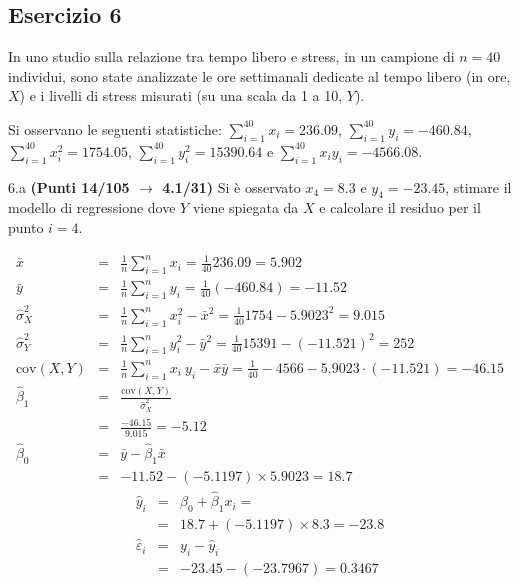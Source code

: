 \documentclass[
  11pt,
]{book}
\theoremstyle{mytheoremstyle}
\theoremstyle{mydefstyle}
\newenvironment{sol}
  {
  \begin{tcolorbox}[enhanced,breakable,arc=0.1mm,boxrule=1pt,colback=white,colframe=iblue,
  title=\bf \fontfamily{lmss}\selectfont \hspace{.5 cm} Soluzione,drop fuzzy shadow]

}{
\end{tcolorbox}
  }
\begin{document}
\subsection{Esercizio 6}\label{esercizio-6-34}

In uno studio sulla relazione tra tempo libero e stress, in un campione di \(n=40\) individui, sono state analizzate le ore settimanali dedicate al tempo libero (in ore, \(X\)) e i livelli di stress misurati (su una scala da 1 a 10, \(Y\)).

Si osservano le seguenti statistiche:
\(\sum_{i=1}^{40}x_i=236.09\), \(\sum_{i=1}^{40}y_i=-460.84\),
\(\sum_{i=1}^{40}x_i^2=1754.05\), \(\sum_{i=1}^{40}y_i^2=15390.64\) e \(\sum_{i=1}^{40}x_iy_i=-4566.08\).

6.a \textbf{(Punti 14/105 \(\rightarrow\) 4.1/31)} Si è osservato \(x_4=8.3\) e \(y_4=-23.45\), stimare il modello di regressione dove \(Y\) viene spiegata da \(X\) e calcolare il residuo per il punto \(i=4\).

\begin{sol}
\begin{eqnarray*}
           \bar x &=&\frac 1 n\sum_{i=1}^n x_i = \frac {1}{ 40 }  236.09 =  5.902 \\
           \bar y &=&\frac 1 n\sum_{i=1}^n y_i = \frac {1}{ 40 }  (-460.84) =  -11.52 \\
           \hat\sigma_X^2&=&\frac 1 n\sum_{i=1}^n x_i^2-\bar x^2=\frac {1}{ 40 }  1754  - 5.9023 ^2= 9.015 \\
           \hat\sigma_Y^2&=&\frac 1 n\sum_{i=1}^n y_i^2-\bar y^2=\frac {1}{ 40 }  15391  - (-11.521) ^2= 252 \\
           \text{cov}(X,Y)&=&\frac 1 n\sum_{i=1}^n x_i~y_i-\bar x\bar y=\frac {1}{ 40 }  -4566 - 5.9023 \cdot (-11.521) = -46.15 \\
           \hat\beta_1 &=& \frac{\text{cov}(X,Y)}{\hat\sigma_X^2} \\
                    &=& \frac{ -46.15 }{ 9.015 }  =  -5.12 \\
           \hat\beta_0 &=& \bar y - \hat\beta_1 \bar x\\
                    &=&  -11.52 - (-5.1197) \times  5.9023 = 18.7 
         \end{eqnarray*}\begin{eqnarray*}
\hat y_i &=&\hat\beta_0+\hat\beta_1 x_i=\\ 
&=& 18.7 + (-5.1197) \times 8.3 = -23.8 \\ 
\hat \varepsilon_i &=& y_i-\hat y_i\\ 
&=& -23.45 - (-23.7967) = 0.3467  
\end{eqnarray*}

\end{sol}
\end{document}
